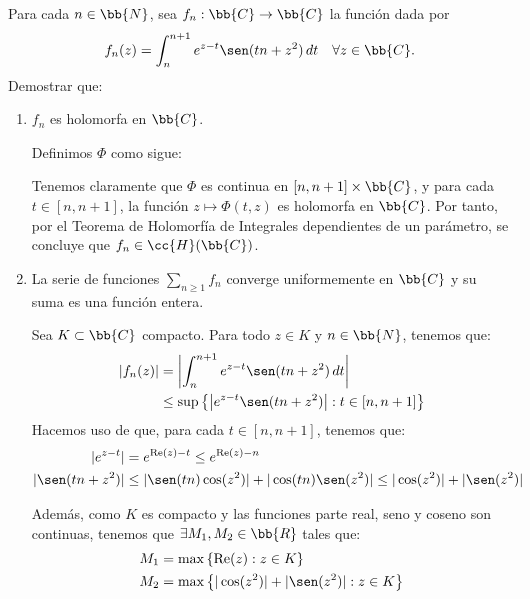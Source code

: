 \documentclass[12pt]{article}
\renewcommand{\Re}{\operatorname{Re}} %
\begin{document}
    \begin{ejercicio}[2.5 puntos]
        Para cada $n \in \bb{N}$, sea $f_n : \bb{C} \to \bb{C}$ la función dada por
        \begin{equation*}
            f_n(z) = \int_n^{n+1} e^{z-t} \sen(tn + z^2) \, dt \quad \forall z \in \bb{C}.
        \end{equation*}
        Demostrar que:
        \begin{enumerate}
            \item $f_n$ es holomorfa en $\bb{C}$.
            
            Definimos $\Phi$ como sigue:

            Tenemos claramente que $\Phi$ es continua en $[n, n+1]\times \bb{C}$, y para cada $t\in [n, n+1]$, la función $z\mapsto \Phi(t, z)$ es holomorfa en $\bb{C}$. Por tanto, por el Teorema de Holomorfía de Integrales dependientes de un parámetro, se concluye que $f_n\in \cc{H}(\bb{C})$.
            \item La serie de funciones $\sum\limits_{n\geq 1} f_n$ converge uniformemente en $\bb{C}$ y su suma es una función entera.
            
            Sea $K\subset \bb{C}$ compacto. Para todo $z\in K$ y $n\in \bb{N}$, tenemos que:
            \begin{align*}
                |f_n(z)| &= \left|\int_n^{n+1} e^{z-t} \sen(tn + z^2) \, dt\right|\\
                &\leq \sup\left\{\left|e^{z-t} \sen(tn + z^2)\right| : t\in [n, n+1]\right\}
            \end{align*}
            Hacemos uso de que, para cada $t\in [n, n+1]$, tenemos que:
            \begin{align*}
                |e^{z-t}| &= e^{\Re(z) - t} \leq e^{\Re(z) - n}\\
                |\sen(tn + z^2)| &\leq |\sen(tn)\cos(z^2)| + |\cos(tn)\sen(z^2)| \leq |\cos(z^2)| + |\sen(z^2)|
            \end{align*}

            Además, como $K$ es compacto y las funciones parte real, seno y coseno son continuas, tenemos que $\exists M_1, M_2\in \bb{R}$ tales que:
            \begin{align*}
                M_1 &= \max\left\{\Re(z) : z\in K\right\}\\
                M_2 &= \max\left\{|\cos(z^2)| + |\sen(z^2)| : z\in K\right\}
            \end{align*}


\end{enumerate}
\end{ejercicio}
\end{document}
